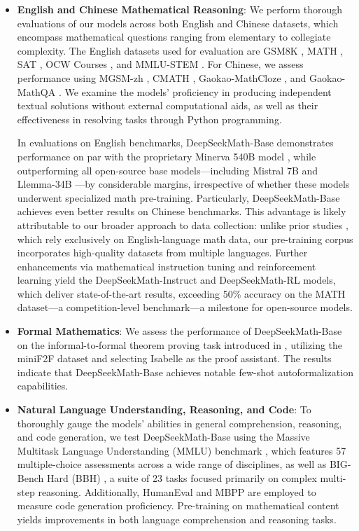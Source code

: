 \begin{itemize}[topsep=0pt]
    \item \textbf{English and Chinese Mathematical Reasoning}: We perform thorough evaluations of our models across both English and Chinese datasets, which encompass mathematical questions ranging from elementary to collegiate complexity. The English datasets used for evaluation are GSM8K \citep{gsm8k}, MATH \citep{MATH}, SAT \citep{llemma}, OCW Courses \citep{minerva}, and MMLU-STEM \citep{mmlu}. For Chinese, we assess performance using MGSM-zh \citep{mgsm}, CMATH \citep{wei2023cmath}, Gaokao-MathCloze \citep{agieval}, and Gaokao-MathQA \citep{agieval}. We examine the models' proficiency in producing independent textual solutions without external computational aids, as well as their effectiveness in resolving tasks through Python programming.

In evaluations on English benchmarks, DeepSeekMath-Base demonstrates performance on par with the proprietary Minerva 540B model \citep{minerva}, while outperforming all open-source base models—including Mistral 7B \citep{mistral} and Llemma-34B \citep{llemma}—by considerable margins, irrespective of whether these models underwent specialized math pre-training. Particularly, DeepSeekMath-Base achieves even better results on Chinese benchmarks. This advantage is likely attributable to our broader approach to data collection: unlike prior studies \citep{minerva, llemma}, which rely exclusively on English-language math data, our pre-training corpus incorporates high-quality datasets from multiple languages. Further enhancements via mathematical instruction tuning and reinforcement learning yield the DeepSeekMath-Instruct and DeepSeekMath-RL models, which deliver state-of-the-art results, exceeding 50\% accuracy on the MATH dataset—a competition-level benchmark—a milestone for open-source models.

\item \textbf{Formal Mathematics}: We assess the performance of DeepSeekMath-Base on the informal-to-formal theorem proving task introduced in \citep{dsp_proof}, utilizing the miniF2F dataset \citep{minif2f} and selecting Isabelle \citep{isabelle} as the proof assistant. The results indicate that DeepSeekMath-Base achieves notable few-shot autoformalization capabilities.
\item \textbf{Natural Language Understanding, Reasoning, and Code}: To thoroughly gauge the models' abilities in general comprehension, reasoning, and code generation, we test DeepSeekMath-Base using the Massive Multitask Language Understanding (MMLU) benchmark \citep{mmlu}, which features 57 multiple-choice assessments across a wide range of disciplines, as well as BIG-Bench Hard (BBH) \citep{bbh}, a suite of 23 tasks focused primarily on complex multi-step reasoning. Additionally, HumanEval \citep{codex} and MBPP \citep{mbpp} are employed to measure code generation proficiency. Pre-training on mathematical content yields improvements in both language comprehension and reasoning tasks.


\end{itemize}
